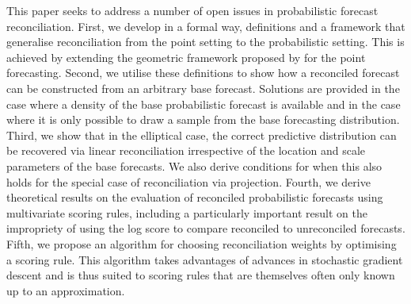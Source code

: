 \documentclass[12pt]{article}
\theoremstyle{definition}
\begin{document}
This paper seeks to address a number of open issues in probabilistic forecast reconciliation.  First, we develop in a formal way, definitions and a framework that generalise reconciliation from the point setting to the probabilistic setting.  This is achieved by extending the geometric framework proposed by \cite{PanEtAl2019HF} for the point forecasting.  Second, we utilise these definitions to show how a reconciled forecast can be constructed from an arbitrary base forecast.  Solutions are provided in the case where a density of the base probabilistic forecast is available and in the case where it is only possible to draw a sample from the base forecasting distribution.  Third, we show that in the elliptical case, the correct predictive distribution can be recovered via linear reconciliation irrespective of the location and scale parameters of the base forecasts.  We also derive conditions for when this also holds for the special case of reconciliation via projection.  Fourth, we derive theoretical results on the evaluation of reconciled probabilistic forecasts using multivariate scoring rules, including a particularly important result on the impropriety of using the log score to compare reconciled to unreconciled forecasts.  Fifth, we propose an algorithm for choosing reconciliation weights by optimising a scoring rule.  This algorithm takes advantages of advances in stochastic gradient descent and is thus suited to scoring rules that are themselves often only known up to an approximation.


\end{document}

